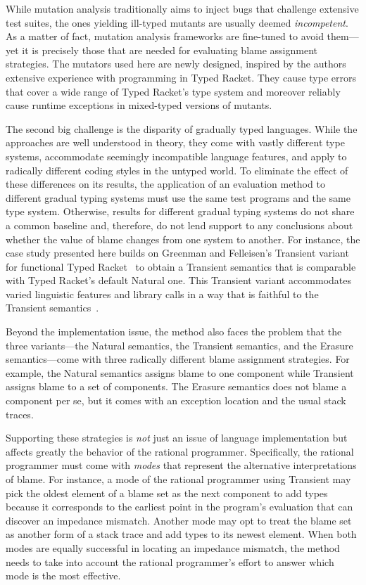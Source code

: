 While mutation analysis traditionally aims to inject bugs that challenge
extensive test suites, the ones yielding ill-typed mutants are usually deemed
\emph{incompetent}. As a matter of fact, mutation analysis frameworks are
fine-tuned to avoid them---yet it is precisely those that are needed for
evaluating blame assignment strategies. The mutators used here are newly designed,
inspired by the authors extensive experience with programming in Typed Racket.
They cause type errors that cover a wide range of Typed Racket's type system and moreover
reliably cause runtime exceptions in mixed-typed versions of mutants.

The second big challenge is the disparity of gradually
typed languages. While the approaches are well understood in theory,
they come with vastly different type systems, accommodate seemingly
incompatible language features, and apply to radically different coding
styles in the untyped world.  To eliminate the effect of these differences 
on its results, the application of an evaluation method to different
gradual typing systems must use the same test programs and the same type
system. Otherwise, results for different gradual typing systems 
do not share a common baseline and, therefore, do not lend support to any
conclusions about whether the value of blame changes from one system to
another. For instance, the case study presented here builds on
Greenman and Felleisen's Transient variant for functional Typed
Racket~\cite{gf-icfp-2018} to obtain a Transient semantics that is
comparable with Typed Racket's default Natural one. This Transient
variant accommodates varied linguistic features and library calls
in a way that is faithful to the Transient
semantics~\cite{vss-popl-2017}.

Beyond the implementation issue, the method also faces the problem that
the three variants---the Natural semantics, the Transient semantics, and
the Erasure semantics---come with three radically different blame
assignment strategies.  For example, the Natural semantics assigns blame
to one component while Transient assigns blame to a set of components. The
Erasure semantics does not blame a component per se, but it comes with an
exception location and the usual stack traces. 

Supporting these strategies is {\em not\/} just an issue of language
implementation but affects greatly the behavior of the rational
programmer.  Specifically, the rational programmer must come with
\emph{modes} that represent the alternative interpretations of blame.  For
instance, a mode of the rational programmer using Transient may pick the
oldest element of a blame set as the next component to add types because
it corresponds to the earliest point in the program's evaluation that can
discover an impedance mismatch.  Another mode may opt to treat the blame
set as another form of a stack trace and add types to its newest element.
When both modes are equally successful in locating an impedance mismatch,
the method needs to take into account the rational programmer's effort
to answer which mode is the most effective. 

